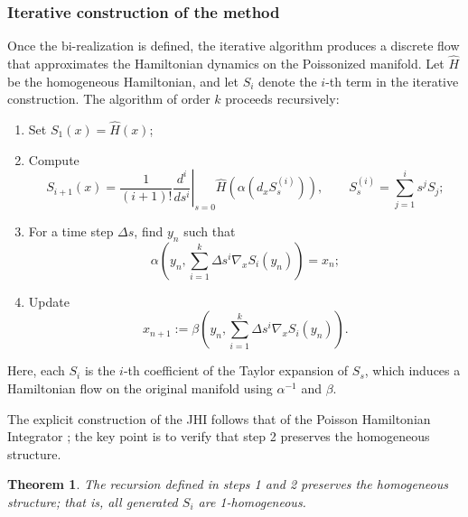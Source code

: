 \documentclass[12pt,english]{article}
\newtheorem{thm}{Theorem}[section]
\begin{document}
\subsubsection{Iterative construction of the method} \label{sec: explicit construction}

Once the bi-realization is defined, the iterative algorithm produces a discrete flow that approximates the Hamiltonian dynamics on the Poissonized manifold. Let $\hat{H}$ be the homogeneous Hamiltonian, and let $S_i$ denote the $i$-th term in the iterative construction. The algorithm of order $k$ proceeds recursively:

\begin{enumerate}
    \item[1.] Set $S_1(x) = \hat{H}(x)$;
    \item[2.] Compute
    \[
        S_{i+1}(x) = \frac{1}{(i+1)!} \left. \frac{d^i}{ds^i} \right|_{s=0} \hat{H}\left( \alpha \left(d_x S_s^{(i)} \right) \right), 
        \qquad S_s^{(i)} = \sum_{j=1}^i s^j S_j;
    \]
    \item[3.] For a time step $\Delta s$, find $y_n$ such that
    \[
        \alpha\left(y_n, \sum_{i=1}^k \Delta s^i \nabla_x S_i(y_n) \right) = x_n;
    \]
    \item[4.] Update
    \[
        x_{n+1} := \beta\left(y_n, \sum_{i=1}^k \Delta s^i \nabla_x S_i(y_n) \right).
    \]
\end{enumerate}

Here, each $S_i$ is the $i$-th coefficient of the Taylor expansion of $S_s$, which induces a Hamiltonian flow on the original manifold using $\alpha^{-1}$ and $\beta$.  

The explicit construction of the JHI follows that of the Poisson Hamiltonian Integrator \cite{cosserat2023numerical}; the key point is to verify that step 2 preserves the homogeneous structure.

\begin{thm}\label{thm: S_i homogeneous}
The recursion defined in steps 1 and 2 preserves the homogeneous structure; that is, all generated $S_i$ are 1-homogeneous.
\end{thm}
\end{document}
